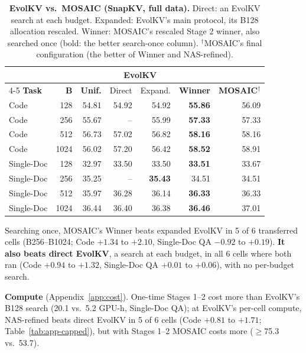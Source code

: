 \documentclass[11pt]{article}
\begin{document}
\begin{table}[t]
  \centering
  \footnotesize
  \setlength{\tabcolsep}{1.5pt}
  \begin{tabular}{@{} l r r r r r r @{}}
    \toprule
    & & & \multicolumn{2}{c}{\textbf{EvolKV}} & & \\
    \cmidrule(lr){4-5}
    \textbf{Task} & \textbf{B} & \textbf{Unif.} & Direct & Expand. & \textbf{Winner} & \textbf{MOSAIC}$^\dagger$ \\
    \midrule
    \rowcolor{gray!10}
    Code       & 128  & 54.81 & 54.92 & 54.92 & \textbf{55.86} & 56.09 \\
    Code       & 256  & 55.67 & --    & 55.99 & \textbf{57.33} & 57.33 \\
    \rowcolor{gray!10}
    Code       & 512  & 56.73 & 57.02 & 56.82 & \textbf{58.16} & 58.16 \\
    Code       & 1024 & 56.02 & 57.20 & 56.42 & \textbf{58.52} & 58.91 \\
    \rowcolor{gray!10}
    Single-Doc & 128  & 32.97 & 33.50 & 33.50 & \textbf{33.51} & 33.67 \\
    Single-Doc & 256  & 35.25 & --    & \textbf{35.43} & 34.51 & 34.51 \\
    \rowcolor{gray!10}
    Single-Doc & 512  & 35.97 & 36.28 & 36.14 & \textbf{36.33} & 36.33 \\
    Single-Doc & 1024 & 36.44 & 36.40 & 36.38 & \textbf{36.46} & 37.01 \\
    \bottomrule
  \end{tabular}
  \caption{\textbf{EvolKV vs.\ MOSAIC (SnapKV, full data).} Direct: an EvolKV search at each budget. Expanded: EvolKV's main protocol, its B128 allocation rescaled. Winner: MOSAIC's rescaled Stage 2 winner, also searched once (bold: the better search-once column). $^\dagger$MOSAIC's final configuration (the better of Winner and NAS-refined).}
  \label{tab:ablation}
\end{table}

Searching once, MOSAIC's Winner beats expanded EvolKV in 5 of 6 transferred cells (B256--B1024; Code $+1.34$ to $+2.10$, Single-Doc QA $-0.92$ to $+0.19$). \textbf{It also beats direct EvolKV}, a search at each budget, in all 6 cells where both ran (Code $+0.94$ to $+1.32$, Single-Doc QA $+0.01$ to $+0.06$), with no per-budget search. 

\textbf{Compute} (Appendix~\ref{app:cost}). One-time Stages 1--2 cost more than EvolKV's B128 search (20.1 vs.\ 5.2 GPU-h, Single-Doc QA); at EvolKV's per-cell compute, NAS-refined beats direct EvolKV in 5 of 6 cells (Code $+0.81$ to $+1.71$; Table~\ref{tab:app-capped}), but with Stages 1--2 MOSAIC costs more ($\geq$75.3 vs.\ 53.7).
\end{document}
